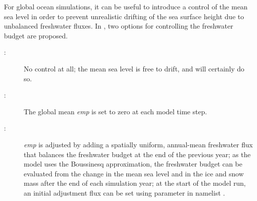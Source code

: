 \documentclass[../main/NEMO_manual]{subfiles}
\begin{document}
For global ocean simulations, it can be useful to introduce a control of the
mean sea level in order to prevent unrealistic drifting of the sea surface
height due to unbalanced freshwater fluxes. In \NEMO, two options for
controlling the freshwater budget are proposed.

\begin{description}
\item [{}:] No control at all; the mean sea level is
  free to drift, and will certainly do so.
\item [{}:] The global mean \textit{emp} is set to zero at each model time step.
\item [{}:] \textit{emp} is adjusted by adding a
  spatially uniform, annual-mean freshwater flux that balances the freshwater
  budget at the end of the previous year; as the model uses the Boussinesq
  approximation, the freshwater budget can be evaluated from the change in the
  mean sea level and in the ice and snow mass after the end of each simulation
  year; at the start of the model run, an initial adjustment flux can be set
  using parameter  in namelist .
\end{description}
\end{document}
